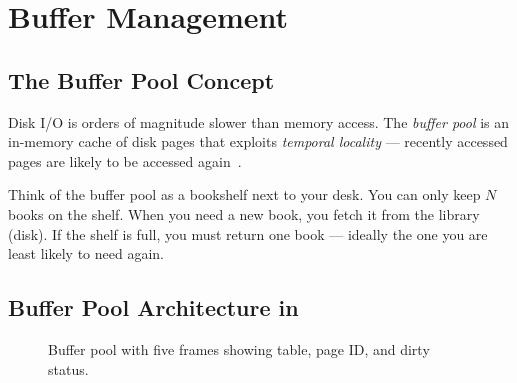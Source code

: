 \chapter{Buffer Management}
\label{ch:buffer-management}

\section{The Buffer Pool Concept}

Disk I/O is orders of magnitude slower than memory access.  The \emph{buffer pool} is an in-memory cache of disk pages that exploits \emph{temporal locality} --- recently accessed pages are likely to be accessed again~\cite{tanenbaum2014modern}.

\begin{conceptbox}
Think of the buffer pool as a bookshelf next to your desk.  You can only keep $N$ books on the shelf.  When you need a new book, you fetch it from the library (disk).  If the shelf is full, you must return one book --- ideally the one you are least likely to need again.
\end{conceptbox}

\section{Buffer Pool Architecture in \shiftdb{}}

\begin{figure}[H]
\centering
{}
\caption{Buffer pool with five frames showing table, page ID, and dirty status.}
\label{fig:buffer-pool}
\end{figure}

